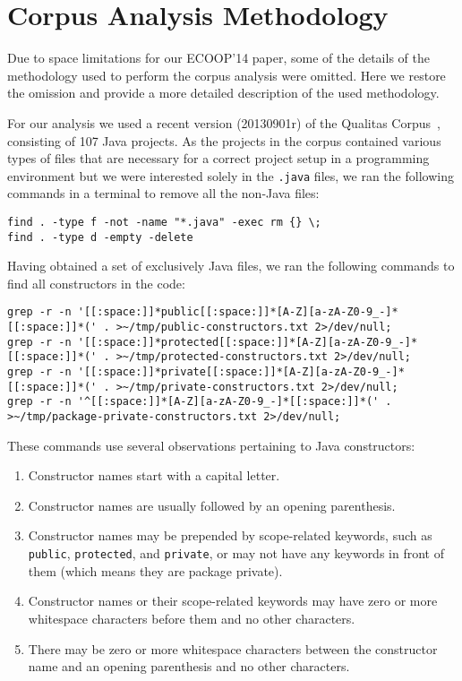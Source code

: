 
\appendix

\section{Corpus Analysis Methodology}

Due to space limitations for our ECOOP'14 paper, some of the details of the methodology used to perform the corpus analysis were omitted. Here we restore the omission and provide a more detailed description of the used methodology.

For our analysis we used a recent version (20130901r) of the Qualitas Corpus~\cite{QualitasCorpus:APSEC:2010}, consisting of 107 Java projects. As the projects in the corpus contained various types of files that are necessary for a correct project setup in a programming environment but we were interested solely in the \lstinline{.java} files, we ran the following commands in a terminal to remove all the non-Java files:

\begin{lstlisting}
find . -type f -not -name "*.java" -exec rm {} \;
find . -type d -empty -delete
\end{lstlisting}

Having obtained a set of exclusively Java files, we ran the following commands to find all constructors in the code:

\begin{lstlisting}
grep -r -n '[[:space:]]*public[[:space:]]*[A-Z][a-zA-Z0-9_-]*[[:space:]]*(' . >~/tmp/public-constructors.txt 2>/dev/null;
grep -r -n '[[:space:]]*protected[[:space:]]*[A-Z][a-zA-Z0-9_-]*[[:space:]]*(' . >~/tmp/protected-constructors.txt 2>/dev/null;
grep -r -n '[[:space:]]*private[[:space:]]*[A-Z][a-zA-Z0-9_-]*[[:space:]]*(' . >~/tmp/private-constructors.txt 2>/dev/null;
grep -r -n '^[[:space:]]*[A-Z][a-zA-Z0-9_-]*[[:space:]]*(' . >~/tmp/package-private-constructors.txt 2>/dev/null;
\end{lstlisting}

These commands use several observations pertaining to Java constructors:

\begin{enumerate}
\item Constructor names start with a capital letter.
\item Constructor names are usually followed by an opening parenthesis.
\item Constructor names may be prepended by scope-related keywords, such as \lstinline{public}, \lstinline{protected}, and \lstinline{private}, or may not have any keywords in front of them (which means they are package private).
\item Constructor names or their scope-related keywords may have zero or more whitespace characters before them and no other characters.
\item There may be zero or more whitespace characters between the constructor name and an opening parenthesis and no other characters.
\end{enumerate}

